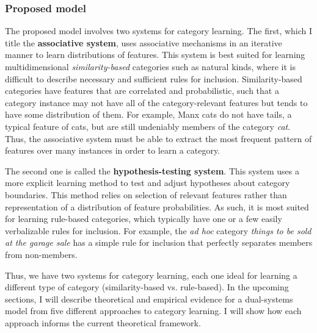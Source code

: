 \documentclass[../dissertation.tex]{subfiles}
\begin{document}
\subsubsection{Proposed model}
	The proposed model involves two systems for category learning. The first, which I title the \textbf{associative system}, uses associative mechanisms in an iterative manner to learn distributions of features. This system is best suited for learning multidimensional \textit{similarity-based} categories such as natural kinds, where it is difficult to describe necessary and sufficient rules for inclusion. Similarity-based categories have features that are correlated and probabilistic, such that a category instance may not have all of the category-relevant features but tends to have some distribution of them. For example, Manx cats do not have tails, a typical feature of cats, but are still undeniably members of the category \textit{cat}. Thus, the associative system must be able to extract the most frequent pattern of features over many instances in order to learn a category. \par
	The second one is called the \textbf{hypothesis-testing system}. This system uses a more explicit learning method to test and adjust hypotheses about category boundaries. This method relies on selection of relevant features rather than representation of a distribution of feature probabilities. As such, it is most suited for learning rule-based categories, which typically have one or a few easily verbalizable rules for inclusion. For example, the \textit{ad hoc} category \textit{things to be sold at the garage sale} has a simple rule for inclusion that perfectly separates members from non-members. \par
	Thus, we have two systems for category learning, each one ideal for learning a different type of category (similarity-based vs. rule-based). In the upcoming sections, I will describe theoretical and empirical evidence for a dual-systems model from five different approaches to category learning. I will show how each approach informs the current theoretical framework.
\end{document}
